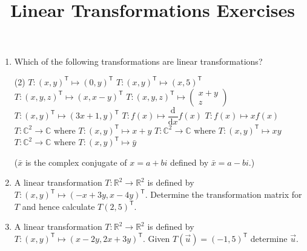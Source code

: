 \documentclass[a4paper,11pt]{article}
\title{Linear Transformations Exercises}
\begin{document}
\maketitle

\begin{enumerate}[label=6.\arabic*]
    \item Which of the following transformations are linear transformations?
    \begin{tasks}(2)
        \task $T: (x, y)^\mathsf{T} \mapsto (0, y)^\mathsf{T}$
        \task $T: (x, y)^\mathsf{T} \mapsto (x, 5)^\mathsf{T}$
        \task $T: (x, y, z)^\mathsf{T} \mapsto (x, x - y)^\mathsf{T}$
        \task $T: (x, y, z)^\mathsf{T} \mapsto \begin{pmatrix} x + y \\ z \end{pmatrix}$
        \task $T: (x, y)^\mathsf{T} \mapsto (3x + 1, y)^\mathsf{T}$
        \task $T: f(x) \mapsto \dfrac{\mathrm{d}}{\mathrm{d}x} f(x)$
        \task $T: f(x) \mapsto xf(x)$
        \task $T: \mathbb{C}^2 \to \mathbb{C}$ where $T: (x, y)^\mathsf{T} \mapsto x + y$
        \task $T: \mathbb{C}^2 \to \mathbb{C}$ where $T: (x, y)^\mathsf{T} \mapsto x y$
        \task $T: \mathbb{C}^2 \to \mathbb{C}$ where $T: (x, y)^\mathsf{T} \mapsto \bar{y}$
    \end{tasks}
    ($\bar{x}$ is the complex conjugate of $x = a + bi$ defined by $\bar{x} = a - bi$.)

    \item A linear transformation $T: \mathbb{R}^2 \to \mathbb{R}^2$ is defined by $T: (x, y)^\mathsf{T} \mapsto (-x + 3y, x - 4y)^\mathsf{T}$. Determine the transformation matrix for $T$ and hence calculate $T (2, 5)^\mathsf{T}$.
    
    \item A linear transformation $T: \mathbb{R}^2 \to \mathbb{R}^2$ is defined by $T: (x, y)^\mathsf{T} \mapsto (x - 2y, 2x + 3y)^\mathsf{T}$. Given $T(\vec{u}) = (-1, 5)^\mathsf{T}$ determine $\vec{u}$.
    

\end{enumerate}
\end{document}
